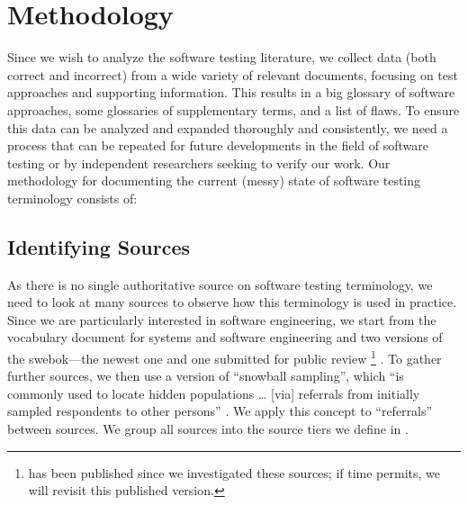 \section{Methodology}\label{methodology}

Since we wish to analyze the software testing literature, we collect data (both
correct and incorrect) from a wide variety of relevant documents, focusing on
test approaches and supporting information. This results in a big
glossary of software approaches, some glossaries of supplementary terms, and a
list of flaws. To ensure this data can be analyzed and expanded thoroughly and
consistently, we need a process that can be repeated for future developments in
the field of software testing or by independent researchers seeking to verify
our work. Our methodology for documenting the current (messy) state of software
testing terminology consists of:



\subsection{Identifying Sources}\label{ident-sources}
As there is no single authoritative source on software testing terminology,
we need to look at many sources to observe how this terminology is used in
practice. Since we are particularly interested in software engineering, we
start from the vocabulary document for systems and software engineering%
\citep{IEEE2017} and two versions of the \acf{swebok}---the newest
one \citep{SWEBOK2014} and one submitted for public review
\footnote{
     \citep{SWEBOK2024} has been published since we investigated
    these sources; if time permits, we will revisit this published version.
}
\citep{SWEBOK2024}. To gather further sources, we then use a version of
``snowball sampling'',
which ``is commonly used to locate hidden populations \dots{} [via] referrals
from initially sampled respondents to other persons'' \citep{Johnson2014}. We
apply this concept to ``referrals'' between sources. \addTextEx{} We group all
sources into the source tiers we define in \listAllSrcs{}.

